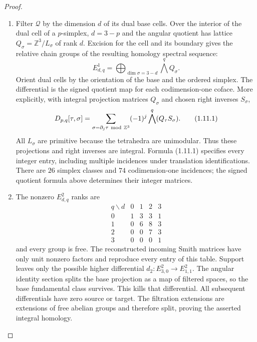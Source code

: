 \begin{proof}
\begin{enumerate}[label={$\langle1\rangle$\arabic*.}]
The polar maps agree under the integral monomial overlaps.
At $C(q)=0$ the deck multipliers have positive real values, so the
logarithmic fibre at angle one is the product of the base and angular
three-tori in item~3, with their given markings.

The mapping-cylinder comparison for a proper vertical log-smooth
family identifies this logarithmic forgetful map with the nearby-fibre collapse, compatibly with the central strata
\cite[formula (3-3-1), p.~478; Theorem 4.1.1 and Lemmas
4.1.2--4.1.3, pp.~480--482]{ffAchingerOgus20}.
Its angular cycles are $a_j$ and its base cycles are $b_j$.
In these column-basis conventions monodromy fixes each $a_j$
and sends $b_j$ to $b_j+a_j$, as specified by $Nb_j=a_j$.
The stratified deformation in item~1 transports this map
back to the original bounded period matrix.

\item Filter $\mathcal Q$ by the dimension $d$ of its dual base cells.
Over the interior of the dual cell of a $p$-simplex, $d=3-p$ and the
angular quotient has lattice
$Q_\sigma=\mathbb Z^3/L_\sigma$ of rank $d$.
Excision for the cell and its boundary gives the relative chain
groups of the resulting homology spectral sequence:
\[
E^1_{d,q}=\bigoplus_{\dim\sigma=3-d}\bigwedge^qQ_\sigma.
\]
Orient dual cells by the orientation of the base and the ordered
simplex.  The differential is the signed quotient map for each
codimension-one coface.  More explicitly, with integral projection
matrices $Q_\sigma$ and chosen right inverses $S_\sigma$,
\[
D_{p,q}[\tau,\sigma]=
 \sum_{\sigma=\partial_j\tau\ {\rm mod}\ \mathbb Z^3}
 (-1)^j\bigwedge^q(Q_\tau S_\sigma).
\tag{1.11.1}
\]
All $L_\sigma$ are primitive because the tetrahedra are unimodular.
Thus these projections and right inverses are integral.  Formula
(1.11.1) specifies every integer entry, including multiple incidences
under translation identifications. There are $26$ simplex classes and $74$ codimension-one incidences;
the signed quotient formula above determines their integer matrices.

\item The nonzero $E^2_{d,q}$ ranks are
\[
\begin{array}{c|rrrr}
q\backslash d&0&1&2&3\\\hline
0&1&3&3&1\\
1&0&6&8&3\\
2&0&0&7&3\\
3&0&0&0&1
\end{array}
\]
and every group is free. The reconstructed incoming Smith matrices
have only unit nonzero factors and reproduce every entry of this table.
Support leaves only the possible higher differential
$d_2:E^2_{3,0}\to E^2_{1,1}$.
The angular identity section splits the base projection as a map of
filtered spaces, so the base fundamental class survives.  This kills
that differential.  All subsequent differentials have zero source or
target.  The filtration extensions are extensions of free abelian
groups and therefore split, proving the asserted integral homology.


\end{enumerate}
\end{proof}

